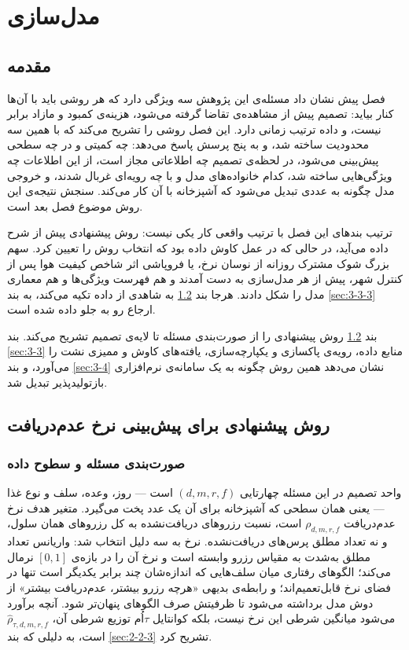 \chapter{مدل‌سازی}

\section{مقدمه}
\label{sec:3-1}

فصل پیش نشان داد مسئله‌ی این پژوهش سه ویژگی دارد که هر روشی باید با آن‌ها کنار بیاید: تصمیم پیش از
مشاهده‌ی تقاضا گرفته می‌شود، هزینه‌ی کمبود و مازاد برابر نیست، و داده ترتیب زمانی دارد.
این فصل روشی را تشریح می‌کند که با همین سه محدودیت ساخته شد، و به پنج پرسش پاسخ می‌دهد:
چه کمیتی و در چه سطحی پیش‌بینی می‌شود، در لحظه‌ی تصمیم چه اطلاعاتی مجاز است، از این
اطلاعات چه ویژگی‌هایی ساخته شد، کدام خانواده‌های مدل و با چه رویه‌ای غربال شدند، و خروجی
مدل چگونه به عددی تبدیل می‌شود که آشپزخانه با آن کار می‌کند. سنجش نتیجه‌ی این روش موضوع
فصل بعد است.

ترتیب بندهای این فصل با ترتیب واقعی کار یکی نیست: روش پیشنهادی پیش از شرح داده می‌آید،
در حالی که در عمل کاوش داده بود که انتخاب روش را تعیین کرد. سهم بزرگ شوک مشترک روزانه
از نوسان نرخ، یا فروپاشی اثر شاخص کیفیت هوا پس از کنترل شهر، پیش از هر مدل‌سازی به دست
آمدند و هم فهرست ویژگی‌ها و هم معماری مدل را شکل دادند. هرجا بند \ref{sec:3-2} به شاهدی
از داده تکیه می‌کند، به بند \ref{sec:3-3-3} ارجاع رو به جلو داده شده است.

بند \ref{sec:3-2} روش پیشنهادی را از صورت‌بندی مسئله تا لایه‌ی تصمیم تشریح می‌کند. بند
\ref{sec:3-3} منابع داده، رویه‌ی پاکسازی و یکپارچه‌سازی، یافته‌های کاوش و ممیزی نشت را
می‌آورد، و بند \ref{sec:3-4} نشان می‌دهد همین روش چگونه به یک سامانه‌ی نرم‌افزاری
بازتولیدپذیر تبدیل شد.

\section{روش پیشنهادی برای پیش‌بینی نرخ عدم‌دریافت}
\label{sec:3-2}

\subsection{صورت‌بندی مسئله و سطوح داده}
\label{sec:3-2-1}

واحد تصمیم در این مسئله چهارتایی $(d,m,r,f)$ است — روز، وعده، سلف و نوع غذا — یعنی
همان سطحی که آشپزخانه برای آن یک عدد پخت می‌گیرد. متغیر هدف نرخ عدم‌دریافت
$\rho_{d,m,r,f}$ است، نسبت رزروهای دریافت‌نشده به کل رزروهای همان سلول، و نه تعداد مطلق
پرس‌های دریافت‌نشده. نرخ به سه دلیل انتخاب شد: واریانس تعداد مطلق به‌شدت به مقیاس رزرو
وابسته است و نرخ آن را در بازه‌ی $[0,1]$ نرمال می‌کند؛ الگوهای رفتاری میان سلف‌هایی که
اندازه‌شان چند برابر یکدیگر است تنها در فضای نرخ قابل‌تعمیم‌اند؛ و رابطه‌ی بدیهی «هرچه
رزرو بیشتر، عدم‌دریافت بیشتر» از دوش مدل برداشته می‌شود تا ظرفیتش صرف الگوهای پنهان‌تر
شود. آنچه برآورد می‌شود میانگین شرطی این نرخ نیست، بلکه کوانتایل $\tau$اُم توزیع شرطی
آن، $\hat\rho_{\tau,d,m,r,f}$ است، به دلیلی که بند \ref{sec:2-2-3} تشریح کرد.

